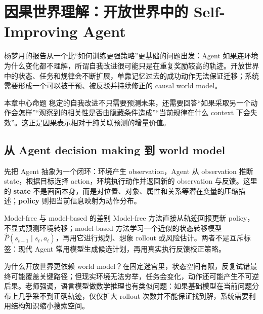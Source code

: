 \section{因果世界理解：开放世界中的 Self-Improving Agent}

杨梦月的报告从一个比“如何训练更强策略”更基础的问题出发：Agent 如果连环境为什么变化都不理解，所谓自我改进很可能只是在重复奖励较高的轨迹。开放世界中的状态、任务和规律会不断扩展，单靠记忆过去的成功动作无法保证迁移；系统需要形成一个可以被干预、被反驳并持续修正的 causal world model。

\begin{importantbox}{本章中心命题}
稳定的自我改进不只需要预测未来，还需要回答“如果采取另一个动作会怎样”“观察到的相关性是否由隐藏条件造成”“当前规律在什么 context 下会失效”。这正是因果表示相对于纯关联预测的增量价值。
\end{importantbox}

\subsection{从 Agent decision making 到 world model}

先把 Agent 抽象为一个闭环：环境产生 observation，Agent 从 observation 推断 state，根据目标选择 action，环境执行动作并返回新的 observation 与反馈。这里的 \textbf{state} 不是画面本身，而是对位置、对象、属性和关系等潜在变量的压缩描述；\textbf{policy} 则把当前信息映射为动作分布。


\begin{knowledgebox}{Model-free 与 model-based 的差别}
Model-free 方法直接从轨迹回报更新 policy，不显式预测环境转移；model-based 方法学习一个近似的状态转移模型 $\hat P(s_{t+1}\mid s_t,a_t)$，再用它进行规划、想象 rollout 或风险估计。两者不是互斥标签：现代 Agent 常用模型生成候选计划，再用真实执行反馈校正策略。
\end{knowledgebox}

为什么开放世界更依赖 world model？在固定迷宫里，状态空间有限，反复试错最终可能覆盖关键路径；但现实环境无法穷举，任务会变化，动作还可能产生不可逆后果。老师强调，语言模型做数学推理也有类似问题：如果基础模型在当前问题分布上几乎采不到正确轨迹，仅仅扩大 rollout 次数并不能保证找到解，系统需要利用结构知识缩小搜索空间。


